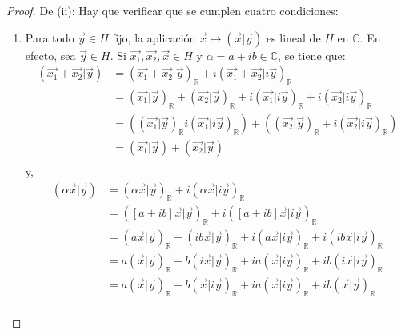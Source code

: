 \documentclass[12pt]{report}
\newcounter{it}
\theoremstyle{largebreak}
\newcommand\pint[2]{\ensuremath{\left(#1\big|#2\right)}}
\begin{document}
\begin{proof}
        De (ii): Hay que verificar que se cumplen cuatro condiciones:
        \begin{enumerate}
            \item Para todo $\vec{y}\in H$ fijo, la aplicación $\vec{x}\mapsto\pint{\vec{x}}{\vec{y}}$ es lineal de $H$ en $\mathbb{C}$. En efecto, sea $\vec{y}\in H$. Si $\vec{x_1},\vec{x_2},\vec{x}\in H$ y $\alpha=a+ib\in\mathbb{C}$, se tiene que:
            \begin{equation*}
                \begin{split}
                    \pint{\vec{x_1}+\vec{x_2}}{\vec{y}}&=\pint{\vec{x_1}+\vec{x_2}}{\vec{y}}_{\mathbb{R}}+i\pint{\vec{x_1}+\vec{x_2}}{i\vec{y}}_{\mathbb{R}}\\
                    &=\pint{\vec{x_1}}{\vec{y}}_{\mathbb{R}}+\pint{\vec{x_2}}{\vec{y}}_{\mathbb{R}}+i\pint{\vec{x_1}}{i\vec{y}}_{\mathbb{R}}+i\pint{\vec{x_2}}{i\vec{y}}_{\mathbb{R}}\\
                    &=(\pint{\vec{x_1}}{\vec{y}}_{\mathbb{R}}i\pint{\vec{x_1}}{i\vec{y}}_{\mathbb{R}})+(\pint{\vec{x_2}}{\vec{y}}_{\mathbb{R}}+i\pint{\vec{x_2}}{i\vec{y}}_{\mathbb{R}})\\
                    &=\pint{\vec{x_1}}{\vec{y}}+\pint{\vec{x_2}}{\vec{y}}\\
                \end{split}
            \end{equation*}
            y,
            \begin{equation*}
                \begin{split}
                    \pint{\alpha\vec{x}}{\vec{y}}&=\pint{\alpha\vec{x}}{\vec{y}}_{\mathbb{R}}+i\pint{\alpha\vec{x}}{i\vec{y}}_{\mathbb{R}}\\
                    &=\pint{[a+ib]\vec{x}}{\vec{y}}_{\mathbb{R}}+i\pint{[a+ib]\vec{x}}{i\vec{y}}_{\mathbb{R}}\\
                    &=\pint{a\vec{x}}{\vec{y}}_{\mathbb{R}}+\pint{ib\vec{x}}{\vec{y}}_{\mathbb{R}}+i\pint{a\vec{x}}{i\vec{y}}_{\mathbb{R}}+i\pint{ib\vec{x}}{i\vec{y}}_{\mathbb{R}}\\
                    &=a\pint{\vec{x}}{\vec{y}}_{\mathbb{R}}+b\pint{i\vec{x}}{\vec{y}}_{\mathbb{R}}+ia\pint{\vec{x}}{i\vec{y}}_{\mathbb{R}}+ib\pint{i\vec{x}}{i\vec{y}}_{\mathbb{R}}\\
                    &=a\pint{\vec{x}}{\vec{y}}_{\mathbb{R}}-b\pint{\vec{x}}{i\vec{y}}_{\mathbb{R}}+ia\pint{\vec{x}}{i\vec{y}}_{\mathbb{R}}+ib\pint{\vec{x}}{\vec{y}}_{\mathbb{R}}\\

\end{split}
\end{equation*}
\end{enumerate}
\end{proof}
\end{document}
